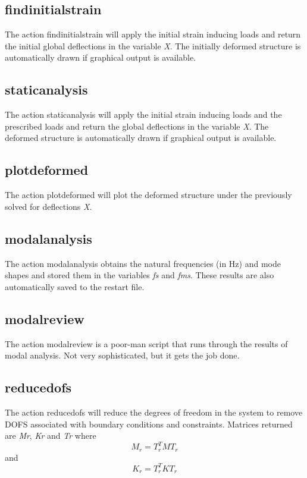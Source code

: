 \documentclass[12pt]{article}
\newcommand*{\command}[1]{\textsf{#1}}
\newcommand*{\variable}[1]{\textit{#1}}
\begin{document}
\subsection{findinitialstrain}
The action \command{findinitialstrain} will apply the initial strain inducing loads and return the initial global deflections in the variable \variable{X}. The initially deformed structure is automatically drawn if graphical output is available. 
\subsection{staticanalysis}
The action \command{staticanalysis} will apply the initial strain inducing loads and the prescribed loads and return the global deflections in the variable \variable{X}. The deformed structure is automatically drawn if graphical output is available. 
\subsection{plotdeformed}
The action \command{plotdeformed} will plot the deformed structure under the previously solved for deflections \variable{X}. 
\subsection{modalanalysis}
The action \command{modalanalysis} obtains the natural frequencies (in Hz) and mode shapes and stored them in the variables \variable{fs} and \variable{fms}. These results are also automatically saved to the restart file.
\subsection{modalreview}
The action \command{modalreview} is a poor-man script that runs through the results of modal analysis. Not very sophisticated, but it gets the job done.
\subsection{reducedofs}
The action \command{reducedofs} will reduce the degrees of freedom in the system to remove DOFS associated with boundary conditions and constraints. Matrices returned are \variable{Mr}, \variable{Kr} and \variable{Tr} where
\begin{equation}
M_r=T_r^T M T_r
\end{equation}
\noindent and
\begin{equation}
K_r=T_r^T K T_r
\end{equation}
\end{document}
